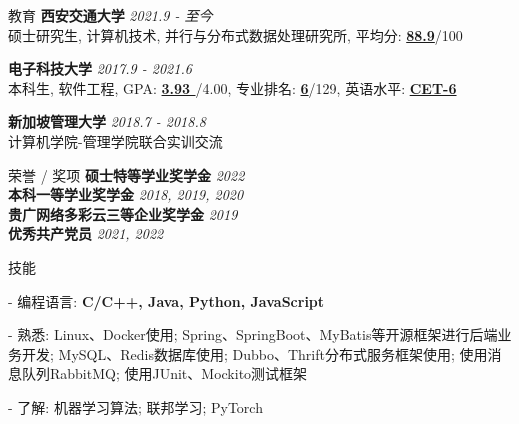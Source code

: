 \documentclass{resume} %
\begin{document}

\begin{rSection}{教育}
{\textbf{西安交通大学}} \hfill {\em 2021.9 - 至今} \\ 
硕士研究生, 计算机技术, 并行与分布式数据处理研究所, 平均分: \textbf{\underline{88.9}}/100

{\textbf{电子科技大学}} \hfill {\em 2017.9 - 2021.6} \\
本科生, 软件工程, GPA: \textbf{\underline{ 3.93 }}/4.00, 专业排名: \textbf{\underline{6}}/129, 英语水平: \textbf{\underline{CET-6}}

{\textbf{新加坡管理大学}} \hfill {\em 2018.7 - 2018.8} \\ 
计算机学院-管理学院联合实训交流

\end{rSection}


\begin{rSection}{荣誉 / 奖项}
    {\textbf{硕士特等学业奖学金}} \hfill {\em 2022} \\
    {\textbf{本科一等学业奖学金}} \hfill {\em 2018, 2019, 2020} \\
    {\textbf{贵广网络多彩云三等企业奖学金}} \hfill {\em 2019} \\
    {\textbf{优秀共产党员}} \hfill {\em 2021, 2022}
\end{rSection}


\begin{rSection}{技能}
    \begin{rSubsection}
    {}{}{}{}
    \item[-] 编程语言: \textbf{C/C++, Java, Python, JavaScript}
    \item[-] 熟悉: Linux、Docker使用; Spring、SpringBoot、MyBatis等开源框架进行后端业务开发; MySQL、Redis数据库使用; Dubbo、Thrift分布式服务框架使用; 使用消息队列RabbitMQ; 使用JUnit、Mockito测试框架
    \item[-] 了解: 机器学习算法; 联邦学习; PyTorch
    \end{rSubsection}
\end{rSection}
    
\end{document}
